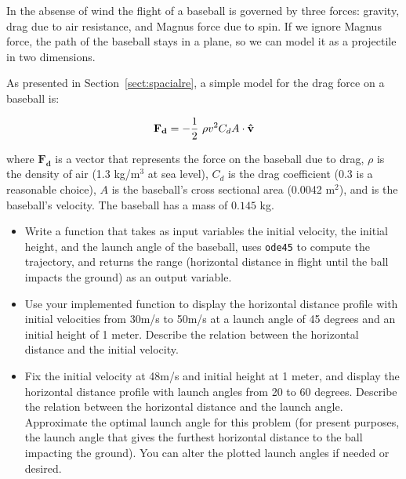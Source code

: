 \documentclass[
]{book}
\renewcommand{\vec}[1]{\bm{\mathbf{#1}}}
\newcommand{\uveci}{{\bm{\hat{\textnormal{\bfseries\i}}}}}
\newcommand{\uvecj}{{\bm{\hat{\textnormal{\bfseries\j}}}}}
\newcommand{\uvec}[1]{%
    \ifthenelse{\equal{#1}{i}}%
        {\uveci}{%
    \ifthenelse{\equal{#1}{j}}%
        {\uvecj}{%
    {\bm{\hat{\mathbf{#1}}}}%
}}}
\begin{document}
\begin{ex}
\label{ex:baseball}

In the absense of wind the flight of a baseball is governed by three forces: gravity,
drag due to air resistance, and Magnus force due to spin.  If
we ignore Magnus force, the path of the baseball stays
in a plane, so we can model it as a projectile in two
dimensions.

As presented in Section~\ref{sect:spacialre}, a simple model for the drag force
    on a baseball is:

\begin{equation}
    \vec{F_d} = - \frac{1}{2} ~ \rho v^2 C_d A \cdot \uvec{v}
\end{equation}


where $\vec{F_d}$ is a vector that represents the force on the baseball
    due to drag, $\rho$ is the density of air (1.3 kg/m$^3$ at sea
    level), $C_d$ is the drag coefficient (0.3 is a reasonable choice),
     $A$ is the baseball's cross sectional area (0.0042 m$^2$), and
    \vec{v} is the baseball's velocity.  The baseball has a mass of
    $0.145$ kg.

\begin{itemize}

\item Write a function that takes
as input variables
the initial velocity, the initial height, and the launch angle of the baseball,
uses {\tt ode45} to compute
the trajectory, and returns the range (horizontal distance in flight until
the ball impacts the ground)
as an output variable.

\item Use your implemented function to display the horizontal distance profile
with initial velocities from 30m/s to 50m/s at a launch angle of 45 degrees
and an initial height of 1 meter.
Describe the relation between the horizontal distance and the initial velocity.

\item Fix the initial velocity at 48m/s and initial height at 1 meter, and display
the horizontal distance profile
with launch angles from 20 to 60 degrees. Describe the relation between
the horizontal distance and the launch angle.  Approximate the optimal
launch angle for this problem (for present purposes, the launch angle that gives the furthest horizontal distance to the ball impacting the ground).
You can alter the plotted launch angles if needed or desired.

\end{itemize}

\end{ex}
\end{document}

